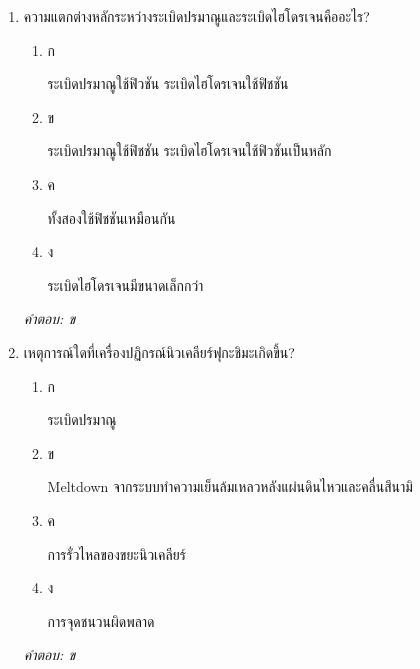 \documentclass[12pt]{article}
\begin{document}
\begin{enumerate}[label=\arabic*., itemsep=0.5\baselineskip, topsep=0.5\baselineskip, leftmargin=*]
\item ความแตกต่างหลักระหว่างระเบิดปรมาณูและระเบิดไฮโดรเจนคืออะไร?
\begin{enumerate}[label=\alph*)., itemsep=0.3\baselineskip, topsep=0.3\baselineskip]
\item ก\ 
\begin{minipage}[t]{0.9\linewidth}
\raggedright ระเบิดปรมาณูใช้ฟิวชัน ระเบิดไฮโดรเจนใช้ฟิชชัน
\end{minipage}
\item ข\ 
\begin{minipage}[t]{0.9\linewidth}
\raggedright ระเบิดปรมาณูใช้ฟิชชัน ระเบิดไฮโดรเจนใช้ฟิวชันเป็นหลัก
\end{minipage}
\item ค\ 
\begin{minipage}[t]{0.9\linewidth}
\raggedright ทั้งสองใช้ฟิชชันเหมือนกัน
\end{minipage}
\item ง\ 
\begin{minipage}[t]{0.9\linewidth}
\raggedright ระเบิดไฮโดรเจนมีขนาดเล็กกว่า
\end{minipage}
\end{enumerate}
\vspace{-0.3\baselineskip}
\begin{small}
\textit{คำตอบ: ข}
\end{small}

\item เหตุการณ์ใดที่เครื่องปฏิกรณ์นิวเคลียร์ฟุกะชิมะเกิดขึ้น?
\begin{enumerate}[label=\alph*)., itemsep=0.3\baselineskip, topsep=0.3\baselineskip]
\item ก\ 
\begin{minipage}[t]{0.9\linewidth}
\raggedright ระเบิดปรมาณู
\end{minipage}
\item ข\ 
\begin{minipage}[t]{0.9\linewidth}
\raggedright Meltdown จากระบบทำความเย็นล้มเหลวหลังแผ่นดินไหวและคลื่นสึนามิ
\end{minipage}
\item ค\ 
\begin{minipage}[t]{0.9\linewidth}
\raggedright การรั่วไหลของขยะนิวเคลียร์
\end{minipage}
\item ง\ 
\begin{minipage}[t]{0.9\linewidth}
\raggedright การจุดชนวนผิดพลาด
\end{minipage}
\end{enumerate}
\vspace{-0.3\baselineskip}
\begin{small}
\textit{คำตอบ: ข}
\end{small}


\end{enumerate}
\end{document}
